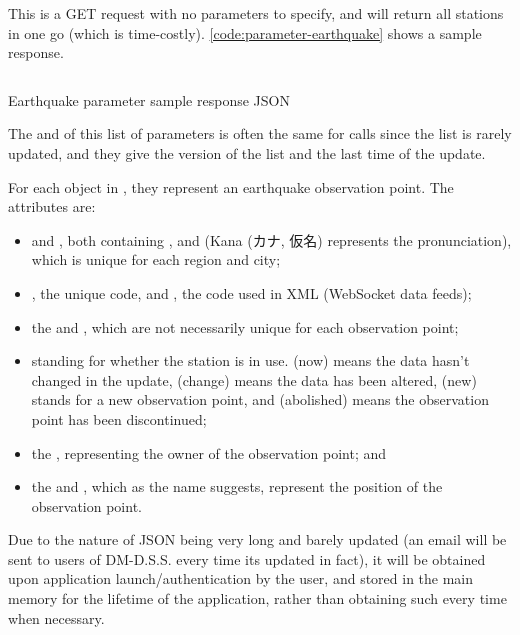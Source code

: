 This is a GET request with no parameters to specify, and will return all stations in one go (which is time-costly). \autoref{code:parameter-earthquake} shows a sample response.

\begin{listing}[htp]
    \inputminted{json}{code/ParameterEarthquake.json}
    \caption{Earthquake parameter sample response JSON}
    \label{code:parameter-earthquake}
\end{listing}

The  and  of this list of parameters is often the same for calls since the list is rarely updated, and they give the version of the list and the last time of the update.

For each object in , they represent an earthquake observation point. The attributes are:
\begin{itemize}
    \item {} and , both containing ,  and  (Kana (カナ, 仮名) represents the pronunciation), which is unique for each region and city;
    \item {}, the unique code, and , the code used in XML (WebSocket data feeds);
    \item the  and , which are not necessarily unique for each observation point;
    \item {} standing for whether the station is in use.  (now) means the data hasn't changed in the update,  (change) means the data has been altered,  (new) stands for a new observation point, and  (abolished) means the observation point has been discontinued;
    \item the , representing the owner of the observation point; and
    \item the  and , which as the name suggests, represent the position of the observation point.
\end{itemize}

Due to the nature of JSON being very long and barely updated (an email will be sent to users of DM-D.S.S. every time its updated in fact), it will be obtained upon application launch/authentication by the user, and stored in the main memory for the lifetime of the application, rather than obtaining such every time when necessary.


